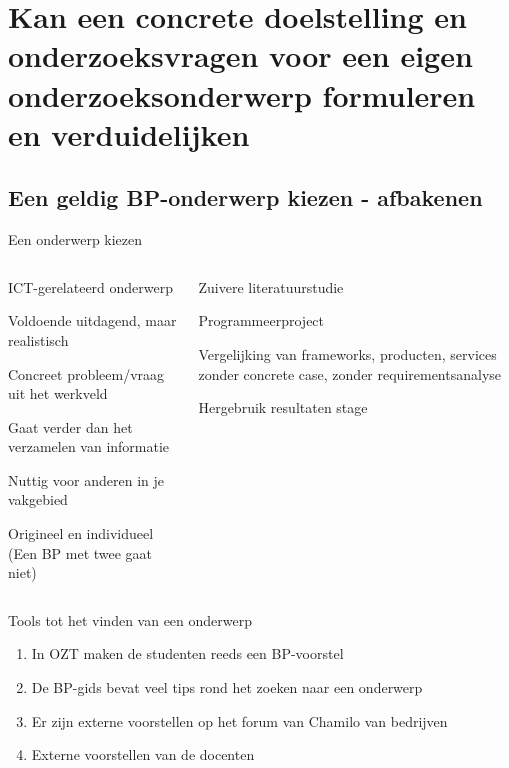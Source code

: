 \section{Kan een concrete doelstelling en onderzoeksvragen voor een eigen onderzoeksonderwerp formuleren en verduidelijken}

\sectionframelogo{}

\subsection{Een geldig BP-onderwerp kiezen - afbakenen}
\begin{frame}{Een onderwerp kiezen}
	
	\begin{columns}[c]


		\begin{itemize}
			\item \textcolor{HoGentAccent3}{ICT-gerelateerd onderwerp
			\item Voldoende uitdagend, maar realistisch
			\item Concreet probleem/vraag uit het werkveld
			\item Gaat verder dan het verzamelen van informatie
			\item Nuttig voor anderen in je vakgebied
			\item Origineel en individueel (Een BP met twee gaat niet)}
		\end{itemize}
	
	
	

	\begin{itemize}
		\item \textcolor{HoGentAccent2}{Zuivere literatuurstudie
		\item Programmeerproject
		\item Vergelijking van frameworks, producten, services zonder
		concrete case, zonder requirementsanalyse
		\item  Hergebruik resultaten stage}
	\end{itemize}
		
	\end{columns}	
	
\end{frame}


\begin{frame}{Tools tot het vinden van een onderwerp}
	\begin{enumerate}
		\item In OZT maken de studenten reeds een BP-voorstel
		\item De BP-gids bevat veel tips rond het zoeken naar een onderwerp
		\item Er zijn externe voorstellen op het forum van Chamilo van bedrijven
		\item \textcolor{HoGentAccent1}{Externe voorstellen van de docenten}
	\end{enumerate}
\end{frame}